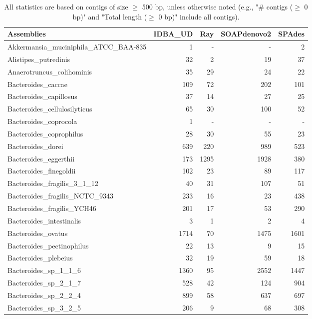 \documentclass[12pt,a4paper]{article}
\begin{document}
\begin{table}[ht]
\begin{center}
\caption{All statistics are based on contigs of size $\geq$ 500 bp, unless otherwise noted (e.g., "\# contigs ($\geq$ 0 bp)" and "Total length ($\geq$ 0 bp)" include all contigs).}
\begin{tabular}{|l*{4}{|r}|}
\hline
Assemblies & IDBA\_UD & Ray & SOAPdenovo2 & SPAdes \\ \hline
Akkermansia\_muciniphila\_ATCC\_BAA-835 & 1 & - & - & 2 \\ \hline
Alistipes\_putredinis & 32 & 2 & 19 & 37 \\ \hline
Anaerotruncus\_colihominis & 35 & 29 & 24 & 22 \\ \hline
Bacteroides\_caccae & 109 & 72 & 202 & 101 \\ \hline
Bacteroides\_capillosus & 37 & 14 & 27 & 25 \\ \hline
Bacteroides\_cellulosilyticus & 65 & 30 & 100 & 52 \\ \hline
Bacteroides\_coprocola & 1 & - & - & - \\ \hline
Bacteroides\_coprophilus & 28 & 30 & 55 & 23 \\ \hline
Bacteroides\_dorei & 639 & 220 & 989 & 523 \\ \hline
Bacteroides\_eggerthii & 173 & 1295 & 1928 & 380 \\ \hline
Bacteroides\_finegoldii & 102 & 23 & 89 & 117 \\ \hline
Bacteroides\_fragilis\_3\_1\_12 & 40 & 31 & 107 & 51 \\ \hline
Bacteroides\_fragilis\_NCTC\_9343 & 233 & 16 & 23 & 438 \\ \hline
Bacteroides\_fragilis\_YCH46 & 201 & 17 & 53 & 290 \\ \hline
Bacteroides\_intestinalis & 3 & 1 & 2 & 4 \\ \hline
Bacteroides\_ovatus & 1714 & 70 & 1475 & 1601 \\ \hline
Bacteroides\_pectinophilus & 22 & 13 & 9 & 15 \\ \hline
Bacteroides\_plebeius & 32 & 19 & 59 & 18 \\ \hline
Bacteroides\_sp\_1\_1\_6 & 1360 & 95 & 2552 & 1447 \\ \hline
Bacteroides\_sp\_2\_1\_7 & 528 & 42 & 124 & 904 \\ \hline
Bacteroides\_sp\_2\_2\_4 & 899 & 58 & 637 & 697 \\ \hline
Bacteroides\_sp\_3\_2\_5 & 206 & 9 & 68 & 308 \\ \hline

\end{tabular}
\end{center}
\end{table}
\end{document}
